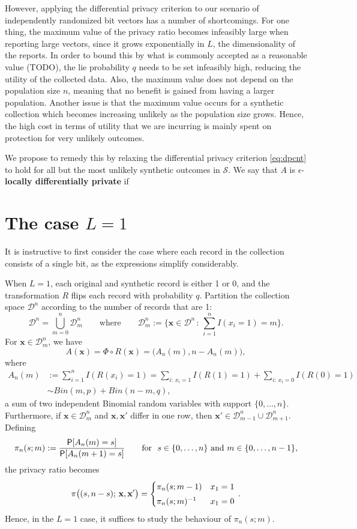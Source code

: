 \documentclass[11pt,draft]{article}
\newcommand{\Dsp}{\mathcal{D}}
\newcommand{\Ssp}{\mathcal{S}}
\newcommand{\xv}{\mathbf{x}}
\begin{document}
However, applying the differential privacy criterion to our scenario of
independently randomized bit vectors has a number of shortcomings.
For one thing, the maximum value of the privacy ratio becomes infeasibly large
when reporting large vectors, since it grows exponentially in $L$, the
dimensionality of the reports.
In order to bound this by what is commonly accepted as a reasonable value
(TODO), the lie probability $q$ needs to be set infeasibly high, reducing the
utility of the collected data.
Also, the maximum value does not depend on the population size $n$, meaning
that no benefit is gained from having a larger population.
Another issue is that the maximum value occurs for a synthetic collection
which becomes increasing unlikely as the population size grows. Hence, the high
cost in terms of utility that we are incurring is mainly spent on protection
for very unlikely outcomes.

We propose to remedy this by relaxing the differential privacy criterion 
\eqref{eq:dpcnt} to hold for all but the most unlikely synthetic outcomes
in $\Ssp$.
We say that $A$ is $\epsilon$-\textbf{locally differentially private} if


\section{The case $L = 1$}

It is instructive to first consider the case where each record in the collection consists of a single bit, as the expressions simplify considerably.

When $L=1$, each original and synthetic record is either 1 or 0, and the transformation $R$ flips each record with probability $q$.
Partition the collection space $\Dsp^n$ according to the number of records that are 1:
\[ \Dsp^n = \bigcup_{m = 0}^n \Dsp_m^n
\quad\quad\text{where}\quad\quad
\Dsp_m^n := \bigg\{ \xv\in\Dsp^n \,:\, \sum_{i=1}^n I(x_i = 1) = m \bigg\}.
\]
For $\xv\in\Dsp_m^n$, we have
\[ A(\xv) = \Phi\circ R(\xv) = \big(A_n(m), n - A_n(m)\big), \]
where
\begin{align*}
A_n(m) &:= \sum_{i=1}^n I(R(x_i) = 1)
= \sum_{i:\, x_i = 1} I(R(1) = 1) + \sum_{i:\, x_i = 0} I(R(0) = 1) \\
&\sim Bin(m, p) + Bin(n-m, q),
\end{align*}
a sum of two independent Binomial random variables with support $\{0,\dots,n\}$.
Furthermore, if $\xv\in\Dsp_m^n$ and $\xv,\xv'$ differ in one row, then $\xv'\in\Dsp_{m-1}^n \cup \Dsp_{m+1}^n$.
Defining
\[ \pi_n(s; m) := \frac{\P[A_n(m) = s]}{\P[A_n(m+1) = s]}
\quad\quad\text{for}\ \ 
s\in\{0,\dots,n\}\ \text{and}\ m\in\{0,\dots,n-1\},
\]
the privacy ratio becomes
\[ \pi\big((s, n-s);\,\xv,\xv'\big) =
\begin{cases}
\pi_n(s;m - 1) & x_1 = 1 \\[0.3em]
\inv{\pi_n(s;m)} & x_1 = 0
\end{cases}\, .
\]
Hence, in the $L=1$ case, it suffices to study the behaviour of $\pi_n(s;m)$.
\end{document}
